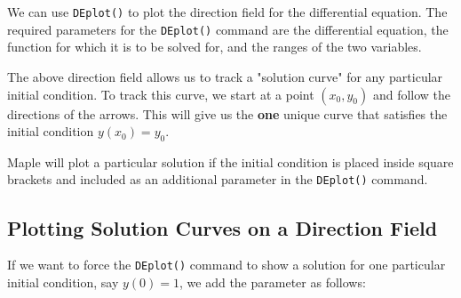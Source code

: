 We can use \texttt{DEplot()} to plot the direction field for the differential equation. The required parameters for the \texttt{DEplot()} command are the differential equation, the function for which it is to be solved for, and the ranges of the two variables.


\begin{maplegroup}
\begin{mapleinput}
\end{mapleinput}
\mapleresult
{}
\end{maplegroup}

The above direction field allows us to track a "solution curve" for any particular initial condition. To track this curve, we start at a point $(x_0, y_0)$ and follow the directions of the arrows. This will give us the \textbf{one} unique curve that satisfies the initial condition $y(x_0)=y_0$. 

Maple will plot a particular solution if the initial condition is placed inside square brackets and included as an additional parameter in the \texttt{DEplot()} command.

\subsection{Plotting Solution Curves on a Direction Field}


If we want to force the \texttt{DEplot()} command to show a solution for one particular initial condition, say $y(0)=1$, we add the parameter as follows:

\begin{maplegroup}
\begin{mapleinput}
\end{mapleinput}
\mapleresult
{}
\end{maplegroup}

